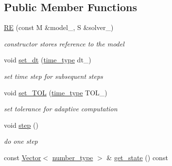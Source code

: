 \subsection*{Public Member Functions}
\begin{DoxyCompactItemize}
\item 
\hypertarget{classhdnum_1_1RE_a32795cf679545f00cb1d750cee95d168}{
\hyperlink{classhdnum_1_1RE_a32795cf679545f00cb1d750cee95d168}{RE} (const M \&model\_\-, S \&solver\_\-)}
\label{classhdnum_1_1RE_a32795cf679545f00cb1d750cee95d168}

\begin{DoxyCompactList}\small\item\em constructor stores reference to the model \item\end{DoxyCompactList}\item 
\hypertarget{classhdnum_1_1RE_aa08735eb2e917aaab79b516a89f40c97}{
void \hyperlink{classhdnum_1_1RE_aa08735eb2e917aaab79b516a89f40c97}{set\_\-dt} (\hyperlink{classhdnum_1_1RE_ae91da4bd459d3c8961c678e9ea53cdc7}{time\_\-type} dt\_\-)}
\label{classhdnum_1_1RE_aa08735eb2e917aaab79b516a89f40c97}

\begin{DoxyCompactList}\small\item\em set time step for subsequent steps \item\end{DoxyCompactList}\item 
\hypertarget{classhdnum_1_1RE_a784627ea3d588d5ba0838832db4d2856}{
void \hyperlink{classhdnum_1_1RE_a784627ea3d588d5ba0838832db4d2856}{set\_\-TOL} (\hyperlink{classhdnum_1_1RE_ae91da4bd459d3c8961c678e9ea53cdc7}{time\_\-type} TOL\_\-)}
\label{classhdnum_1_1RE_a784627ea3d588d5ba0838832db4d2856}

\begin{DoxyCompactList}\small\item\em set tolerance for adaptive computation \item\end{DoxyCompactList}\item 
\hypertarget{classhdnum_1_1RE_a65c8908666fbe5773417155ec3fc5161}{
void \hyperlink{classhdnum_1_1RE_a65c8908666fbe5773417155ec3fc5161}{step} ()}
\label{classhdnum_1_1RE_a65c8908666fbe5773417155ec3fc5161}

\begin{DoxyCompactList}\small\item\em do one step \item\end{DoxyCompactList}\item 
\hypertarget{classhdnum_1_1RE_a96ab38554c88dd93dcad6e64def6706b}{
const \hyperlink{classhdnum_1_1Vector}{Vector}$<$ \hyperlink{classhdnum_1_1RE_a0223c61d464ed8b6fd3e84878e1b6cec}{number\_\-type} $>$ \& \hyperlink{classhdnum_1_1RE_a96ab38554c88dd93dcad6e64def6706b}{get\_\-state} () const }
\label{classhdnum_1_1RE_a96ab38554c88dd93dcad6e64def6706b}


\end{DoxyCompactItemize}
